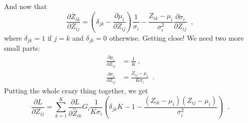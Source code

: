 And now that
\[
\frac{\partial \overline{Z}_{ik}}{\partial Z_{ij}}  = 
\left(\delta_{jk} - \frac{\partial \mu_i}{\partial Z_{ij}}\right) \frac{1}{\sigma_i} -
\frac{Z_{ik} - \mu_i}{\sigma_i^2} \frac{\partial \sigma_i}{\partial Z_{ij}} \;\;,
\]
where $\delta_{jk} = 1$ if $j = k$ and $\delta_{jk} = 0$ otherwise.
Getting close!  We need two more small parts:
\begin{align*}
  \frac{\partial \mu_i}{\partial Z_{ij}} & = \frac{1}{K} \;,\\
  \frac{\partial \sigma_i}{\partial Z_{ij}} & = 
        \frac{Z_{ij} - \mu_i}{K \sigma_i}\;\;.
\end{align*}
Putting the whole crazy thing together, we get
\[\frac{\partial L}{\partial Z_{ij}} =
  \sum_{k=1}^K\frac{\partial L}{\partial \widehat{Z}_{ik}}
  G_i\frac{1}{K \sigma_i}\left(\delta_{jk}K-1 - \frac{(Z_{ik} - \mu_i)(Z_{ij} - \mu_i)}{\sigma_i^2}
\right)\;\;.
\]


